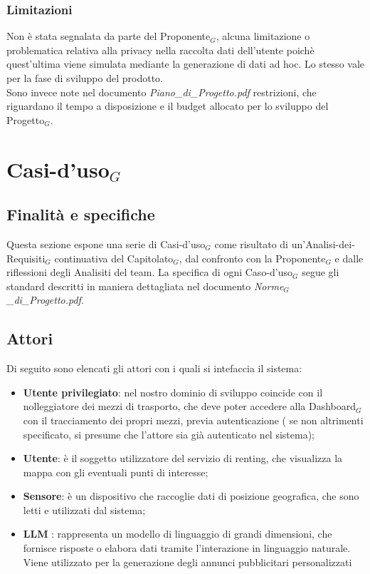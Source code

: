 \documentclass[11pt]{article}
\begin{document}
\begin{justify}
\subsubsection{Limitazioni}
Non è stata segnalata da parte del Proponente$_G$, alcuna limitazione o problematica relativa alla privacy nella raccolta dati dell'utente poichè quest'ultima viene simulata mediante la generazione di dati ad hoc. Lo stesso vale per la fase di sviluppo del prodotto.\\
Sono invece note nel documento \textit{Piano\_di\_Progetto.pdf} restrizioni, che riguardano il tempo a disposizione e il budget allocato per lo sviluppo del Progetto$_G$. 

\newpage
\section{Casi-d'uso$_G$}
\label{sec:casi-uso}

\subsection{Finalità e specifiche}
Questa sezione espone una serie di Casi-d'uso$_G$ come risultato di un'Analisi-dei-Requisiti$_G$ continuativa del Capitolato$_G$, dal confronto con la Proponente$_G$ e dalle riflessioni degli Analisiti del team. La specifica di ogni Caso-d'uso$_G$ segue gli standard descritti in maniera dettagliata nel documento \textit{Norme$_G$\_di\_Progetto.pdf}.
\subsection{Attori}
Di seguito sono elencati gli attori con i quali si intefaccia il sistema:
\begin{itemize}
    \item \textbf{Utente privilegiato}: nel nostro dominio di sviluppo coincide con il nolleggiatore dei mezzi di trasporto, che deve poter accedere alla Dashboard$_G$ con il tracciamento dei propri mezzi, previa autenticazione ( se non altrimenti specificato, si presume che l'attore sia già autenticato nel sistema);
    \item \textbf{Utente}: è il soggetto utilizzatore del servizio di renting, che visualizza la mappa con gli eventuali punti di interesse;
    \item \textbf{Sensore}: è un dispositivo che raccoglie dati di posizione geografica, che sono letti e utilizzati dal sistema;
    \item \textbf{LLM} : rappresenta un modello di linguaggio di grandi dimensioni, che fornisce risposte o elabora dati tramite l'interazione in linguaggio naturale. Viene utilizzato per la generazione degli annunci pubblicitari personalizzati
\end{itemize}


\end{justify}
\end{document}
